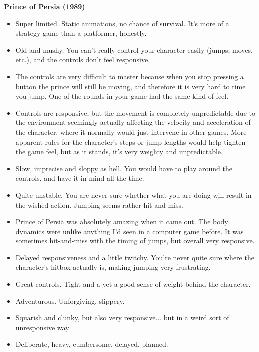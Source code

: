 \textbf{Prince of Persia (1989)}
\vspace{-5mm}
\begin{itemize}[noitemsep,nolistsep]
\item Super limited. Static animations, no chance of survival. It's more of a strategy game than a platformer, honestly.
\item Old and mushy. You can't really control your character easily (jumps, moves, etc.), and the controls don't feel responsive.
\item The controls are very difficult to master because when you stop pressing a button the prince will still be moving, and therefore it is very hard to time you jump. One of the rounds in your game had the same kind of feel.
\item Controls are responsive, but the movement is completely unpredictable due to the environment seemingly actually affecting the velocity and acceleration of the character, where it normally would just intervene in other games. More apparent rules for the character's steps or jump lengths would help tighten the game feel, but as it stands, it's very weighty and unpredictable.
\item Slow, imprecise and sloppy as hell. You would have to play around the controls, and have it in mind all the time.
\item Quite unstable. You are never sure whether what you are doing will result in the wished action. Jumping seems rather hit and miss.
\item Prince of Persia was absolutely amazing when it came out. The body dynamics were unlike anything I'd seen in a computer game before. It was sometimes hit-and-miss with the timing of jumps, but overall very responsive.
\item Delayed responsiveness and a little twitchy. You're never quite sure where the character's hitbox actually is, making jumping very frustrating.
\item Great controls. Tight and a yet a good sense of weight behind the character.
\item Adventurous. Unforgiving, slippery.
\item Squarish and clunky, but also very responsive... but in a weird sort of unresponsive way
\item Deliberate, heavy, cumbersome, delayed, planned. 
\end{itemize}

